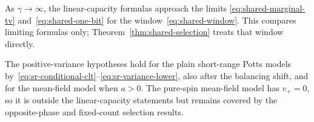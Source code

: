 As $\gamma\to\infty$, the linear-capacity formulas approach the
limits \eqref{eq:shared-marginal-tv} and~\eqref{eq:shared-one-bit} for
the window~\eqref{eq:shared-window}. This compares limiting formulas only;
Theorem~\ref{thm:shared-selection} treats that window directly.

The positive-variance hypotheses hold for the plain short-range Potts
models by~\eqref{eq:sr-conditional-clt}--\eqref{eq:sr-variance-lower},
also after the balancing shift, and for the mean-field model when
$a>0$. The pure-spin mean-field model has $v_+=0$, so it is outside the
linear-capacity statements but remains covered by the opposite-phase
and fixed-count selection results.

